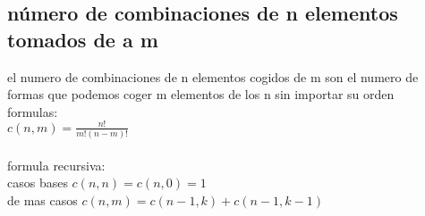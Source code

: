 \subsection{número de combinaciones de n elementos tomados de a m}
el numero de combinaciones de n elementos cogidos de m son el numero de formas que podemos coger m elementos de los n sin importar su orden\\
formulas:\\
$c(n,m)=\frac{n!}{m!(n-m)!}$\\
\\
formula recursiva:\\
casos bases $c(n,n)=c(n,0)=1$\\
de mas casos $c(n,m)=c(n-1,k)+c(n-1,k-1)$
